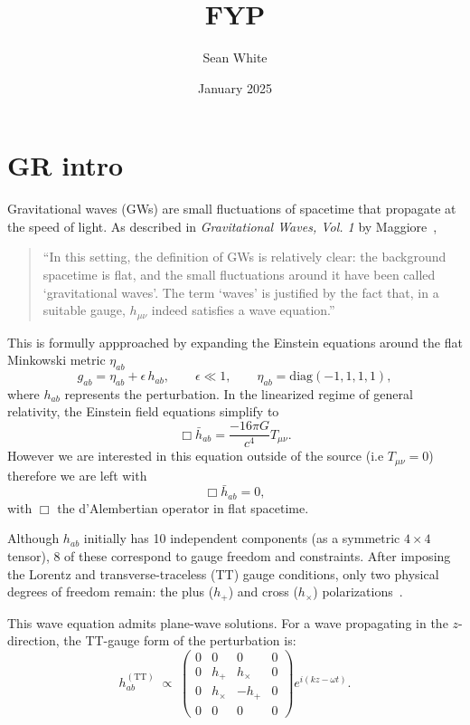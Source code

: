 \documentclass{article}
\title{FYP }
\author{Sean White}
\date{January 2025}
\begin{document}
\maketitle

\section{GR intro}


Gravitational waves (GWs) are small fluctuations of spacetime that propagate at the speed of light. As described in \textit{Gravitational Waves, Vol. 1} by Maggiore~\cite[p.~29]{GRbook},
\begin{quote}
“In this setting, the definition of GWs is relatively clear: the background spacetime is flat, and the small fluctuations around it have been called ‘gravitational waves’. The term ‘waves’ is justified by the fact that, in a suitable gauge, \(h_{\mu\nu}\) indeed satisfies a wave equation.”
\end{quote}
This is formully appproached by expanding the Einstein equations around the flat Minkowski metric $\eta _{a b}$ 
\begin{equation}
g_{ab} = \eta_{ab} + \epsilon\,h_{ab},
\qquad
\epsilon \ll 1,
\qquad
\eta_{ab} = \mathrm{diag}(-1, 1, 1, 1),
\end{equation}
where \(h_{ab}\) represents the perturbation. In the linearized regime of general relativity, the Einstein field equations simplify to
\begin{equation}
    \Box \bar{h}_{ab} = \frac{-16\pi G}{c^4} T_{\mu \nu}.
\end{equation}
However we are interested in this equation outside of the source (i.e $T_{\mu \nu} =0$) therefore we are left with 
\begin{equation}
    \Box \bar{h}_{ab} = 0, 
\end{equation}
with \(\Box\) the d’Alembertian operator in flat spacetime.

\noindent
Although \(h_{ab}\) initially has 10 independent components (as a symmetric $4 \times 4$ tensor), 8 of these correspond to gauge freedom and constraints. After imposing the Lorentz and transverse-traceless (TT) gauge conditions, only two physical degrees of freedom remain: the plus (\(h_+\)) and cross (\(h_\times\)) polarizations~\cite[Sec.~1.2]{GRbook}.

\noindent
This wave equation admits plane-wave solutions. For a wave propagating in the \(z\)-direction, the TT-gauge form of the perturbation is:
\begin{equation}
h_{ab}^{(\mathrm{TT})} \;\propto\;
\begin{pmatrix}
0 & 0 & 0 & 0 \\
0 & h_+ & h_\times & 0 \\
0 & h_\times & -h_+ & 0 \\
0 & 0 & 0 & 0
\end{pmatrix}
e^{i(kz-\omega t)}.
\end{equation}
\end{document}
